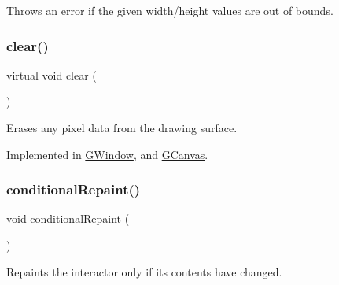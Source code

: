 Throws an error if the given width/height values are out of bounds. 

\mbox{\label{classGDrawingSurface_a5eeb94d22b8366d1b68d0614384802fe}} 
\subsubsection{\texorpdfstring{clear()}{clear()}}
{\footnotesize\ttfamily virtual void clear (\begin{DoxyParamCaption}{ }\end{DoxyParamCaption})\hspace{0.3cm}{\ttfamily [pure virtual]}}



Erases any pixel data from the drawing surface. 



Implemented in \mbox{\hyperlink{classGWindow_aee7cb2065b88d21ac4ad05bc997ecf82}{G\+Window}}, and \mbox{\hyperlink{classGCanvas_aee7cb2065b88d21ac4ad05bc997ecf82}{G\+Canvas}}.

\mbox{\label{classGDrawingSurface_a221b3e75bb3d9d0bfea62b3364e6773b}} 
\subsubsection{\texorpdfstring{conditional\+Repaint()}{conditionalRepaint()}}
{\footnotesize\ttfamily void conditional\+Repaint (\begin{DoxyParamCaption}{ }\end{DoxyParamCaption})\hspace{0.3cm}{\ttfamily [virtual]}}



Repaints the interactor only if its contents have changed. 

\mbox{\label{classGDrawingSurface_aedd4b792311d946eeaf44b0de337a408}} 
